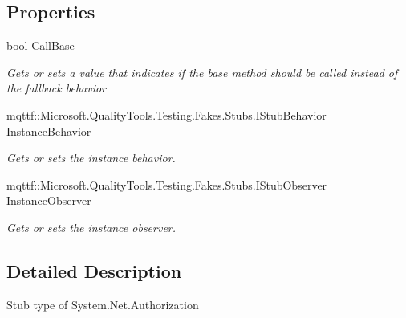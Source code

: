 \subsection*{Properties}
\begin{DoxyCompactItemize}
\item 
bool \hyperlink{class_system_1_1_net_1_1_fakes_1_1_stub_authorization_a560d862ce9e7b53f43df8a50c9fa3a04}{Call\-Base}
\begin{DoxyCompactList}\small\item\em Gets or sets a value that indicates if the base method should be called instead of the fallback behavior\end{DoxyCompactList}\item 
mqttf\-::\-Microsoft.\-Quality\-Tools.\-Testing.\-Fakes.\-Stubs.\-I\-Stub\-Behavior \hyperlink{class_system_1_1_net_1_1_fakes_1_1_stub_authorization_a865ff3d3045430d92b8c1ad7850fdee6}{Instance\-Behavior}
\begin{DoxyCompactList}\small\item\em Gets or sets the instance behavior.\end{DoxyCompactList}\item 
mqttf\-::\-Microsoft.\-Quality\-Tools.\-Testing.\-Fakes.\-Stubs.\-I\-Stub\-Observer \hyperlink{class_system_1_1_net_1_1_fakes_1_1_stub_authorization_a96633714e28258c587ce9d47eb7168a9}{Instance\-Observer}
\begin{DoxyCompactList}\small\item\em Gets or sets the instance observer.\end{DoxyCompactList}\end{DoxyCompactItemize}


\subsection{Detailed Description}
Stub type of System.\-Net.\-Authorization



